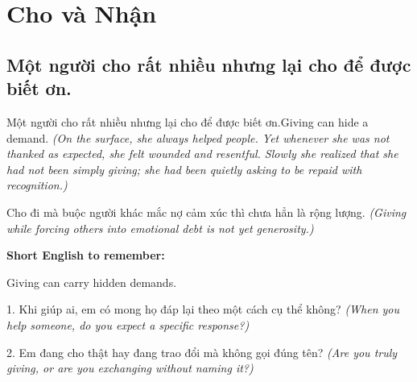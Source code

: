 \chapter{Cho và Nhận}

\section{Một người cho rất nhiều nhưng lại cho để được biết ơn.}
\begin{truyen}{Một người cho rất nhiều nhưng lại cho để được biết ơn.}{Giving can hide a demand.}
\textit{(On the surface, she always helped people. Yet whenever she was not thanked as expected, she felt wounded and resentful. Slowly she realized that she had not been simply giving; she had been quietly asking to be repaid with recognition.)}
\end{truyen}
\begin{baihoc}
Cho đi mà buộc người khác mắc nợ cảm xúc thì chưa hẳn là rộng lượng.
\textit{(Giving while forcing others into emotional debt is not yet generosity.)}
\end{baihoc}
\begin{ghinhoanh}
\textbf{Short English to remember:}

Giving can carry hidden demands.
\end{ghinhoanh}
\begin{tuhocnhanh}
1. Khi giúp ai, em có mong họ đáp lại theo một cách cụ thể không? \textit{(When you help someone, do you expect a specific response?)}

2. Em đang cho thật hay đang trao đổi mà không gọi đúng tên? \textit{(Are you truly giving, or are you exchanging without naming it?)}
\end{tuhocnhanh}
\ngancach


